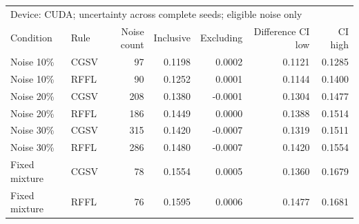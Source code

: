 \begin{tabular}{llrrrrr}
\toprule
\multicolumn{7}{l}{Device: CUDA; uncertainty across complete seeds; eligible noise only} \\
Condition & Rule & Noise count & Inclusive & Excluding & Difference CI low & CI high \\
\midrule
Noise 10\% & CGSV & 97 & 0.1198 & 0.0002 & 0.1121 & 0.1285 \\
Noise 10\% & RFFL & 90 & 0.1252 & 0.0001 & 0.1144 & 0.1400 \\
Noise 20\% & CGSV & 208 & 0.1380 & -0.0001 & 0.1304 & 0.1477 \\
Noise 20\% & RFFL & 186 & 0.1449 & 0.0000 & 0.1388 & 0.1514 \\
Noise 30\% & CGSV & 315 & 0.1420 & -0.0007 & 0.1319 & 0.1511 \\
Noise 30\% & RFFL & 286 & 0.1480 & -0.0007 & 0.1420 & 0.1554 \\
Fixed mixture & CGSV & 78 & 0.1554 & 0.0005 & 0.1360 & 0.1679 \\
Fixed mixture & RFFL & 76 & 0.1595 & 0.0006 & 0.1477 & 0.1681 \\
\bottomrule
\end{tabular}
